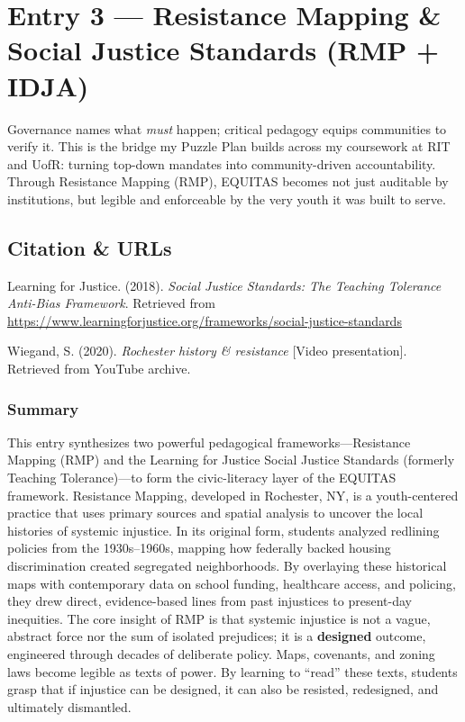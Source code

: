 \documentclass[11pt,twoside]{article}
\begin{document}
\newpage

\section*{Entry 3 --- Resistance Mapping \& Social Justice Standards (RMP + IDJA)}

{
\vspace{-0.3cm}
Governance names what \emph{must} happen; critical pedagogy equips communities to verify it. This is the bridge my Puzzle Plan builds across my coursework at RIT and UofR: turning top-down mandates into community-driven accountability. Through Resistance Mapping (RMP), \textsc{EQUITAS} becomes not just auditable by institutions, but legible and enforceable by the very youth it was built to serve.}

\vspace{-0.3cm}
\subsection*{Citation \& URLs}

\vspace{-0.3cm}
Learning for Justice. (2018). \textit{Social Justice Standards: The Teaching Tolerance Anti-Bias Framework}. Retrieved from \\ \href{https://www.learningforjustice.org/frameworks/social-justice-standards}{https://www.learningforjustice.org/frameworks/social-justice-standards}

Wiegand, S. (2020). \textit{Rochester history \& resistance} [Video presentation]. Retrieved from YouTube archive.

\vspace{-0.3cm}
\subsubsection*{Summary}

\vspace{-0.3cm}
This entry synthesizes two powerful pedagogical frameworks—Resistance Mapping (RMP) and the Learning for Justice Social Justice Standards (formerly Teaching Tolerance)—to form the civic-literacy layer of the \textsc{EQUITAS} framework. Resistance Mapping, developed in Rochester, NY, is a youth-centered practice that uses primary sources and spatial analysis to uncover the local histories of systemic injustice. In its original form, students analyzed redlining policies from the 1930s–1960s, mapping how federally backed housing discrimination created segregated neighborhoods. By overlaying these historical maps with contemporary data on school funding, healthcare access, and policing, they drew direct, evidence-based lines from past injustices to present-day inequities. The core insight of RMP is that systemic injustice is not a vague, abstract force nor the sum of isolated prejudices; it is a \textbf{designed} outcome, engineered through decades of deliberate policy. Maps, covenants, and zoning laws become legible as texts of power. By learning to “read” these texts, students grasp that if injustice can be designed, it can also be resisted, redesigned, and ultimately dismantled.
\end{document}

